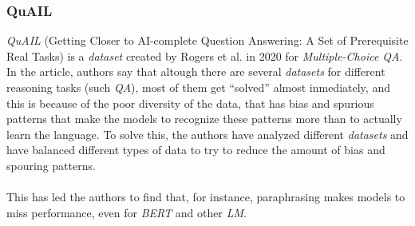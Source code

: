 \subsubsection{QuAIL}
\label{sec:quail}
\emph{QuAIL} (Getting Closer to AI-complete Question Answering: A Set of Prerequisite Real Tasks)\cite{Rogers2020} is a \emph{dataset} created by Rogers et al. in 2020 for \emph{Multiple-Choice QA}. In the article, authors say that altough there are several \emph{datasets} for different reasoning tasks (such \emph{QA}), most of them get ``solved'' almost inmediately, and this is because of the poor diversity of the data, that has bias and spurious patterns that make the models to recognize these patterns more than to actually learn the language. To solve this, the authors have analyzed different \emph{datasets} and have balanced different types of data to try to reduce the amount of bias and spouring patterns.
\paragraph{}
This has led the authors to find that, for instance, paraphrasing makes models to miss performance, even for \emph{BERT} and other \emph{LM}.
